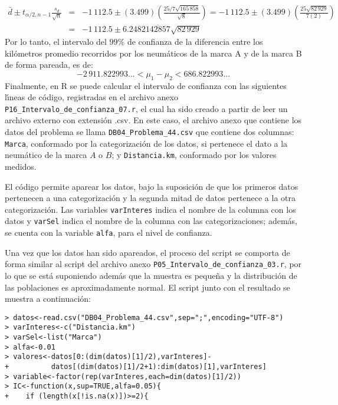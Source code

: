 \begin{solucion}
\begin{eqnarray*}
  \bar{d} \pm t_{\alpha/2,n-1}\frac{s_d}{\sqrt{n}} & = & -1\,112.5 \pm (3.499)\left( \frac{25/7\sqrt{165\,858}}{\sqrt{8}} \right) = -1\,112.5 \pm (3.499) \left( \frac{25\sqrt{82\,929}}{7(2)} \right) \\
  & = & -1\,112.5 \pm 6.2482\overline{142857}\sqrt{82\,929}
 \end{eqnarray*}
 Por lo tanto, el intervalo del $99\%$ de confianza de la diferencia entre los kil\'ometros promedio recorridos por los neum\'aticos de la marca A y de la marca B de forma pareada, es de:
 \begin{equation*}
  -2\,911.822993... < \mu_1 - \mu_2 < 686.822993...
 \end{equation*}
 Finalmente, en R se puede calcular el intervalo de confianza con las siguientes l\'{\i}neas de c\'odigo, registradas en el archivo anexo \texttt{P16\_Intervalo\_de\_confianza\_07.r}, el cual ha sido creado a partir de leer un archivo externo con extensi\'on .csv. En este caso, el archivo anexo que contiene los datos del problema se llama \texttt{DB04\_Problema\_44.csv} que contiene dos columnas: \texttt{Marca}, conformado por la categorizaci\'on de los datos, si pertenece el dato a la neum\'atico de la marca $A$ o $B$; y \texttt{Distancia.km}, conformado por los valores medidos.
 \par 
 El c\'odigo permite aparear los datos, bajo la suposici\'on de que los primeros datos pertenecen a una categorizaci\'on y la segunda mitad de datos pertenece a la otra categorizaci\'on. Las variables \texttt{varInteres} indica el nombre de la columna con los datos y \texttt{varSel} indica el nombre de la columna con las categorizaciones; adem\'as, se cuenta con la variable \texttt{alfa}, para el nivel de confianza.
 \par 
 Una vez que los datos han sido apareados, el proceso del script se comporta de forma similar al script del archivo anexo \texttt{P05\_Intervalo\_de\_confianza\_03.r}, por lo que se est\'a suponiendo adem\'as que la muestra es peque\~na y la distribuci\'on de las poblaciones es aproximadamente normal. El script junto con el resultado se muestra a continuaci\'on:
 \begin{verbatim}
> datos<-read.csv("DB04_Problema_44.csv",sep=";",encoding="UTF-8")
> varInteres<-c("Distancia.km")
> varSel<-list("Marca")
> alfa<-0.01
> valores<-datos[0:(dim(datos)[1]/2),varInteres]-
+          datos[(dim(datos)[1]/2+1):dim(datos)[1],varInteres]
> variable<-factor(rep(varInteres,each=dim(datos)[1]/2))
> IC<-function(x,sup=TRUE,alfa=0.05){
+    if (length(x[!is.na(x)])>=2){

\end{verbatim}
\end{solucion}
